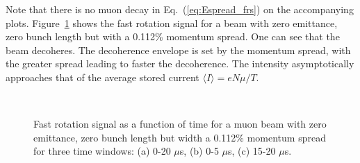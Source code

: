 Note that there is no muon decay in Eq.~(\ref{eq:Espread_frs}) on the accompanying plots. Figure~\ref{fig:Espread_frs} shows the fast rotation signal for a beam with zero emittance, zero bunch length but with a 0.112\% momentum spread. One can see that the beam decoheres. The decoherence envelope is set by the momentum spread, with the greater spread leading to faster the decoherence.
The intensity asymptotically approaches that of the average stored current $\langle I\rangle = eN\mu/T$.

\begin{figure}[bt]
\centering
{}\\
\caption{Fast rotation signal as a function of time for a muon beam with zero emittance, zero bunch length but width a 0.112\% momentum spread for three time windows: (a) 0-20 $\mu$s, (b) 0-5 $\mu$s, (c) 15-20 $\mu$s.}
\label{fig:Espread_frs}
\end{figure}

